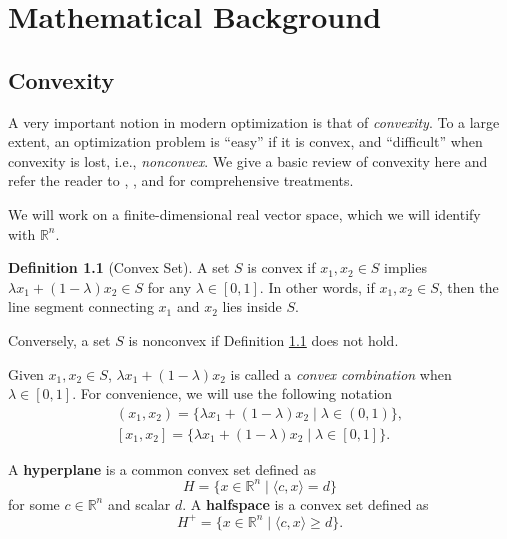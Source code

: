 \documentclass[
]{book}
\theoremstyle{definition}
\newtheorem{definition}{Definition}[chapter]
\theoremstyle{definition}
\theoremstyle{definition}
\theoremstyle{definition}
\theoremstyle{remark}
\begin{document}
\hypertarget{background}{%
\chapter{Mathematical Background}\label{background}}

\hypertarget{background:convexity}{%
\section{Convexity}\label{background:convexity}}

A very important notion in modern optimization is that of \emph{convexity}. To a large extent, an optimization problem is ``easy'' if it is convex, and ``difficult'' when convexity is lost, i.e., \emph{nonconvex}. We give a basic review of convexity here and refer the reader to \citep{rockafellar70-convexanalysis}, \citep{boyd04book-convex}, and \citep{bertsekas03book-convex} for comprehensive treatments.

We will work on a finite-dimensional real vector space, which we will identify with \(\mathbb{R}^{n}\).

\begin{definition}[Convex Set]
\protect\hypertarget{def:ConvexSet}{}\label{def:ConvexSet}A set \(S\) is convex if \(x_1,x_2 \in S\) implies \(\lambda x_1 + (1-\lambda) x_2 \in S\) for any \(\lambda \in [0,1]\). In other words, if \(x_1,x_2 \in S\), then the line segment connecting \(x_1\) and \(x_2\) lies inside \(S\).
\end{definition}

Conversely, a set \(S\) is nonconvex if Definition \ref{def:ConvexSet} does not hold.

Given \(x_1, x_2 \in S\), \(\lambda x_1 + (1-\lambda) x_2\) is called a \emph{convex combination} when \(\lambda \in [0,1]\). For convenience, we will use the following notation
\begin{equation}
\begin{split}
(x_1,x_2) = \{ \lambda x_1 + (1-\lambda) x_2 \mid \lambda \in (0,1) \}, \\ [x_1,x_2] = \{ \lambda x_1 + (1-\lambda) x_2 \mid \lambda \in [0,1] \}.
\end{split}
\end{equation}

A \textbf{hyperplane} is a common convex set defined as
\begin{equation}
H = \{  x \in \mathbb{R}^{n} \mid \langle c, x \rangle = d  \}
\label{eq:hyperplane}
\end{equation}
for some \(c \in \mathbb{R}^{n}\) and scalar \(d\). A \textbf{halfspace} is a convex set defined as
\begin{equation}
H^{+} = \{  x \in \mathbb{R}^{n} \mid \langle c, x \rangle \geq d  \}.
\label{eq:halfspace}
\end{equation}
\end{document}
